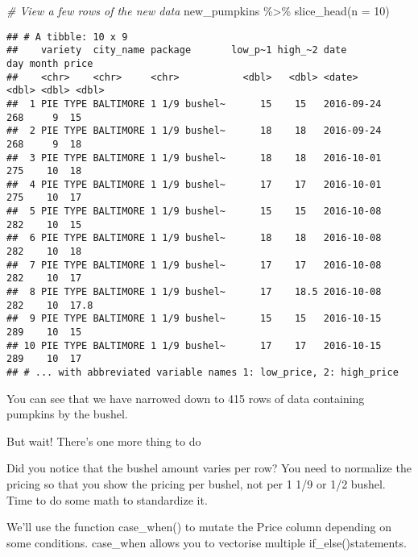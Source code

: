 \documentclass[
]{article}
\newenvironment{Shaded}{\begin{snugshade}}{\end{snugshade}}
\newcommand{\AttributeTok}[1]{\textcolor[rgb]{0.77,0.63,0.00}{#1}}
\newcommand{\CommentTok}[1]{\textcolor[rgb]{0.56,0.35,0.01}{\textit{#1}}}
\newcommand{\DecValTok}[1]{\textcolor[rgb]{0.00,0.00,0.81}{#1}}
\newcommand{\FunctionTok}[1]{\textcolor[rgb]{0.00,0.00,0.00}{#1}}
\newcommand{\NormalTok}[1]{#1}
\newcommand{\SpecialCharTok}[1]{\textcolor[rgb]{0.00,0.00,0.00}{#1}}
\begin{document}
\begin{Shaded}
\begin{Highlighting}[]
\CommentTok{\# View a few rows of the new data}
\NormalTok{new\_pumpkins }\SpecialCharTok{\%\textgreater{}\%} 
  \FunctionTok{slice\_head}\NormalTok{(}\AttributeTok{n =} \DecValTok{10}\NormalTok{)}
\end{Highlighting}
\end{Shaded}

\begin{verbatim}
## # A tibble: 10 x 9
##    variety  city_name package       low_p~1 high_~2 date         day month price
##    <chr>    <chr>     <chr>           <dbl>   <dbl> <date>     <dbl> <dbl> <dbl>
##  1 PIE TYPE BALTIMORE 1 1/9 bushel~      15    15   2016-09-24   268     9  15  
##  2 PIE TYPE BALTIMORE 1 1/9 bushel~      18    18   2016-09-24   268     9  18  
##  3 PIE TYPE BALTIMORE 1 1/9 bushel~      18    18   2016-10-01   275    10  18  
##  4 PIE TYPE BALTIMORE 1 1/9 bushel~      17    17   2016-10-01   275    10  17  
##  5 PIE TYPE BALTIMORE 1 1/9 bushel~      15    15   2016-10-08   282    10  15  
##  6 PIE TYPE BALTIMORE 1 1/9 bushel~      18    18   2016-10-08   282    10  18  
##  7 PIE TYPE BALTIMORE 1 1/9 bushel~      17    17   2016-10-08   282    10  17  
##  8 PIE TYPE BALTIMORE 1 1/9 bushel~      17    18.5 2016-10-08   282    10  17.8
##  9 PIE TYPE BALTIMORE 1 1/9 bushel~      15    15   2016-10-15   289    10  15  
## 10 PIE TYPE BALTIMORE 1 1/9 bushel~      17    17   2016-10-15   289    10  17  
## # ... with abbreviated variable names 1: low_price, 2: high_price
\end{verbatim}

You can see that we have narrowed down to 415 rows of data containing
pumpkins by the bushel.

But wait! There's one more thing to do

Did you notice that the bushel amount varies per row? You need to
normalize the pricing so that you show the pricing per bushel, not per 1
1/9 or 1/2 bushel. Time to do some math to standardize it.

We'll use the function case\_when() to mutate the Price column depending
on some conditions. case\_when allows you to vectorise multiple
if\_else()statements.
\end{document}
